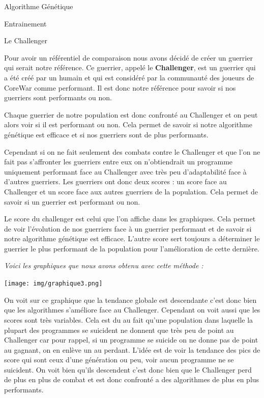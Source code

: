 \documentclass[a4paper, 10pt]{article}
\begin{document}
\begin{section}{Algorithme Génétique}
\begin{subsection}{Entrainement}
                \begin{subsubsection}{Le Challenger}
                    \par
                        Pour avoir un référentiel de comparaison nous avons décidé de créer un guerrier qui serait notre référence. Ce guerrier, appelé le \textbf{Challenger}, est un guerrier qui a été créé par un humain et qui est considéré par la communauté des joueurs de CoreWar comme performant. Il est donc notre référence pour savoir si nos guerriers sont performants ou non.
                        \medskip
                    \par
                        Chaque guerrier de notre population est donc confronté au Challenger et on peut alors voir si il est performant ou non. Cela permet de savoir si notre algorithme génétique est efficace et si nos guerriers sont de plus performants.
                        \medskip
                    \par
                        Cependant si on ne fait seulement des combats contre le Challenger et que l'on ne fait pas s'affronter les guerriers entre eux on n'obtiendrait un programme uniquement performant face au Challenger avec très peu d'adaptabilité face à d'autres guerriers. Les guerriers ont donc deux scores : un score face au Challenger et un score face aux autres guerriers de la population. Cela permet de savoir si un guerrier est performant ou non.
                        \medskip
                    \par
                        Le score du challenger est celui que l'on affiche dans les graphiques. Cela permet de voir l'évolution de nos guerriers face à un guerrier performant et de savoir si notre algorithme génétique est efficace. L'autre score sert toujours a déterminer le guerrier le plus performant de la population pour l'amélioration de cette dernière.
                        \bigskip
                    \par 
                        \textit{Voici les graphiques que nous avons obtenu avec cette méthode :}
                        \medskip
                    \par
                        \texttt{[image: img/graphique3.png]}
                        \bigskip
                    \par
                        On voit sur ce graphique que la tendance globale est descendante c'est donc bien que les algorithmes s'améliore face au Challenger. Cependant on voit aussi que les scores sont très variables. Cela est du au fait qu'une population dans laquelle la plupart des programmes se suicident ne donnent que très peu de point au Challenger car pour rappel, si un programme se suicide on ne donne pas de point au gagnant, on en enlève un au perdant. L'idée est de voir la tendance des pics de score qui sont ceux d'une génération ou peu, voir aucun programme ne se suicident. On voit bien qu'ils descendent c'est donc bien que le Challenger perd de plus en plus de combat et est donc confronté a des algorithmes de plus en plus performants.
                \end{subsubsection} 
                

\end{subsection}
\end{section}
\end{document}

